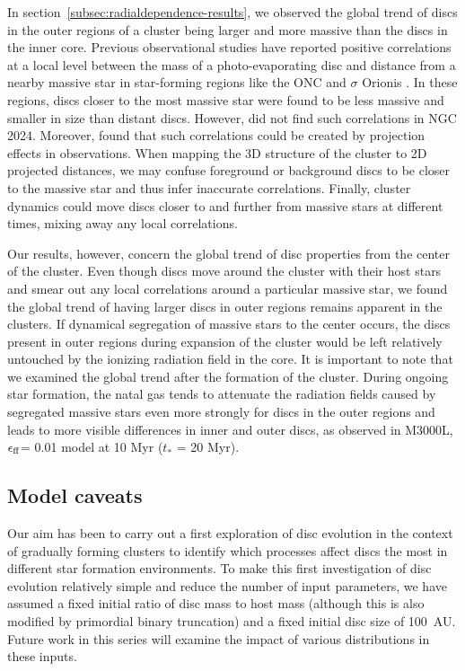 \documentclass[fleqn,usenatbib]{mnras}
\newcommand\sfeff{\ensuremath{\epsilon_{\rm ff}}\xspace}   %
\begin{document}
In section~\ref{subsec:radialdependence-results}, we observed the global trend of discs in the outer regions of a cluster being larger and more massive than the discs in the inner core. Previous observational studies have reported positive correlations at a local level between the mass of a photo-evaporating disc and distance from a nearby massive star in star-forming regions like the ONC \citep{Mann2014ApJ...784...82M} and $\sigma$ Orionis \citep{Ansdell2017AJ....153..240A}. In these regions, discs closer to the most massive star were found to be less massive and smaller in size than distant discs. However, \cite{Mann2015ApJ...802...77M} did not find such correlations in NGC 2024. Moreover, \cite{Parker2021ApJ...913...95P} found that such correlations could be created by projection effects in observations. When mapping the 3D structure of the cluster to 2D projected distances, we may confuse foreground or background discs to be closer to the massive star and thus infer inaccurate correlations. Finally, cluster dynamics could move discs closer to and further from massive stars at different times, mixing away any local correlations. 

Our results, however, concern the global trend of disc properties from the center of the cluster. Even though discs move around the cluster with their host stars and smear out any local correlations around a particular massive star, we found the global trend of having larger discs in outer regions remains apparent in the clusters. If dynamical segregation of massive stars to the center occurs, the discs present in outer regions during expansion of the cluster would be left relatively untouched by the ionizing radiation field in the core. It is important to note that we examined the global trend after the formation of the cluster. During ongoing star formation, the natal gas tends to attenuate the radiation fields caused by segregated massive stars even more strongly for discs in the outer regions and leads to more visible differences in inner and outer discs, as observed in M3000L, \sfeff = 0.01 model at 10 Myr ($t_*$ = 20 Myr). 

\subsection{Model caveats}
\label{subsec:modelcaveats}


Our aim has been to carry out a first exploration of disc evolution in the context of gradually forming clusters to identify which processes affect discs the most in different star formation environments. To make this first investigation of disc evolution relatively simple and reduce the number of input parameters, we have assumed a fixed initial ratio of disc mass to host mass (although this is also modified by primordial binary truncation) and a fixed initial disc size of 100~AU. Future work in this series will examine the impact of various distributions in these inputs.
\end{document}
